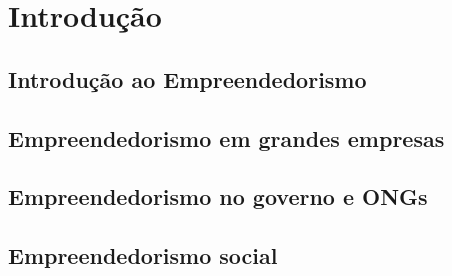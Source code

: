 \section{Introdução}

\subsection{Introdução ao Empreendedorismo}
\subsection{Empreendedorismo em grandes empresas}
\subsection{Empreendedorismo no governo e ONGs}
\subsection{Empreendedorismo social}
